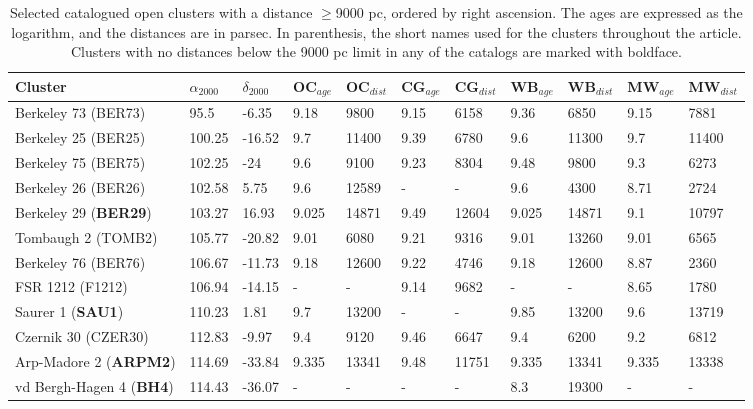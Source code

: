 \documentclass{aa}
\begin{document}
 \begin{table}
 \caption{Selected catalogued open clusters with a distance $\geq$9000 pc,
 ordered by right ascension. The ages are expressed as the logarithm, and the
 distances are in parsec. In parenthesis, the short names used for the clusters
 throughout the article. Clusters with no distances below the 9000 pc limit in
 any of the catalogs are marked with boldface.}
 \label{tab:clusters}
 \centering
 \begin{tabular}{lllllllllll}
 \hline\hline
 Cluster & $\alpha_{2000}$  & $\delta_{2000}$ & OC$_{age}$ & OC$_{dist}$ & CG$_{age}$ &
 CG$_{dist}$ & WB$_{age}$ & WB$_{dist}$ & MW$_{age}$ & MW$_{dist}$ \\
 \hline
 Berkeley 73 (BER73)     & 95.5   & -6.35     & 9.18  & 9800  & 9.15  & 6158  &
 9.36 & 6850 & 9.15  & 7881  \\
 Berkeley 25 (BER25)     & 100.25 & -16.52    & 9.7   & 11400 & 9.39  & 6780  &
 9.6   & 11300 &  9.7   & 11400 \\
 Berkeley  75 (BER75)     & 102.25 & -24       & 9.6   & 9100  & 9.23  &  8304 
 & 9.48  & 9800  & 9.3   & 6273  \\
 Berkeley  26 (BER26)     & 102.58 & 5.75      & 9.6   & 12589 & -   & -   & 9.6
 & 4300  & 8.71  & 2724  \\
 Berkeley  29 (\textbf{BER29})     & 103.27 & 16.93     & 9.025 & 14871 & 9.49  & 12604 &
 9.025 & 14871 & 9.1   & 10797 \\
 Tombaugh 2 (TOMB2)     & 105.77 & -20.82    & 9.01  & 6080  & 9.21  & 9316  &
 9.01 & 13260 & 9.01  & 6565  \\
 Berkeley 76 (BER76)     & 106.67 & -11.73    & 9.18  & 12600 & 9.22  & 4746  &
 9.18 & 12600 & 8.87  & 2360  \\
 FSR 1212 (F1212)   & 106.94 & -14.15    & -   & -   & 9.14  & 9682  & -   & -
 & 8.65  & 1780  \\
 Saurer 1 (\textbf{SAU1})   & 110.23 & 1.81      & 9.7   & 13200 & -   & -   & 9.85  &
 13200 & 9.6   & 13719 \\
 Czernik 30 (CZER30)    & 112.83 & -9.97     & 9.4   & 9120  & 9.46  & 6647  &
 9.4 & 6200  & 9.2   & 6812  \\
 Arp-Madore 2 (\textbf{ARPM2})     & 114.69 & -33.84    & 9.335 & 13341 & 9.48  & 11751 &
 9.335 & 13341 & 9.335 & 13338 \\
 vd Bergh-Hagen 4 (\textbf{BH4})     & 114.43 & -36.07    & -   & -   & -   & -  
 & 8.3   & 19300 & -   & -   \\

\end{tabular}
\end{table}
\end{document}
